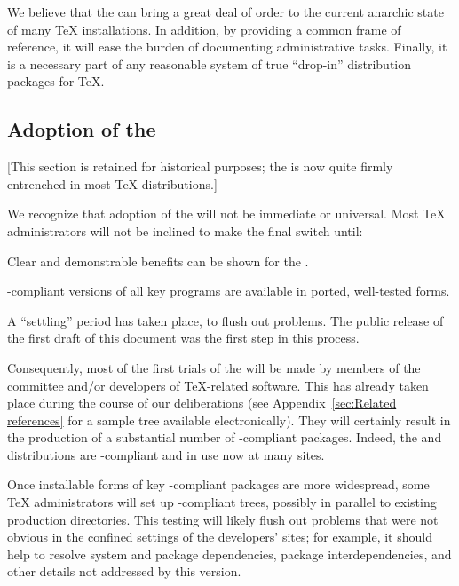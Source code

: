 \documentclass{tdsguide}
\begin{document}
We believe that the  can bring a great deal of order to the
current anarchic state of many \TeX{} installations.  In addition, by
providing a common frame of reference, it will ease the burden of
documenting administrative tasks.  Finally, it is a necessary part of
any reasonable system of true ``drop-in'' distribution packages for
\TeX{}.


\subsection{Adoption of the }

[This section is retained for historical purposes; the 
is now quite firmly entrenched in most \TeX{} distributions.]

We recognize that adoption of the  will not be immediate or
universal.  Most \TeX{} administrators will not be inclined to make the
final switch until:

\begin{itemize-squeeze}
\item Clear and demonstrable benefits can be shown for the .
\item {}-compliant versions of all key programs are available
in ported, well-tested forms.
\item A ``settling'' period has taken place, to flush out problems.  The
public release of the first draft of this document was the first step in
this process.
\end{itemize-squeeze}

Consequently, most of the first trials of the  will be made by
members of the  committee and/or developers of \TeX{}-related
software.  This has already taken place during the course of our
deliberations (see Appendix~\ref{sec:Related references} for a sample
tree available electronically).  They will certainly result in the
production of a substantial number of -compliant packages.
Indeed, the  and 
distributions are -compliant and in use now at many sites.

Once installable forms of key -compliant packages are more
widespread, some \TeX{} administrators will set up -compliant
trees, possibly in parallel to existing production directories.  This
testing will likely flush out problems that were not obvious in the
confined settings of the developers' sites; for example, it should help
to resolve system and package dependencies, package interdependencies, and
other details not addressed by this  version.
\end{document}
